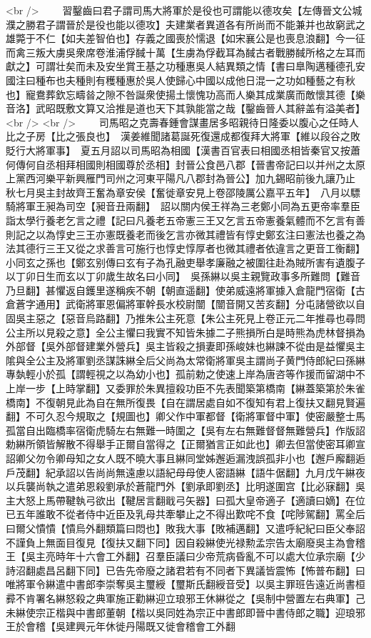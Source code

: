 <br />
　　習鑿齒曰君子謂司馬大將軍於是役也可謂能以德攻矣【左傳晉文公城濮之勝君子謂晉於是役也能以德攻】夫建業者異道各有所尚而不能兼并也故窮武之雄斃于不仁【如夫差智伯也】存義之國喪於懦退【如宋襄公是也喪息浪翻】今一征而禽三叛大虜吳衆席卷淮浦俘馘十萬【生虜為俘截耳為馘古者戰勝馘所格之左耳而獻之】可謂壮矣而未及安坐賞王基之功種惠吳人結異類之情【書曰臯陶邁種德孔安國注曰種布也夫種則有穫種惠於吳人使歸心中國以成他日混一之功如種藝之有秋也】寵鴦葬欽忘疇㫺之隙不咎誕衆使揚土懷愧功高而人樂其成業廣而敵懷其德【樂音洛】武昭既敷文算又洽推是道也天下其孰能當之哉【鑿齒晉人其辭盖有溢美者】<br />
<br />
　　司馬昭之克壽春鍾會謀畫居多昭親待日隆委以腹心之任時人比之子房【比之張良也】　漢姜維聞諸葛誕死復還成都復拜大將軍【維以段谷之敗貶行大將軍事】　夏五月詔以司馬昭為相國【漢書百官表曰相國丞相皆秦官又按蕭何傳何自丞相拜相國則相國尊於丞相】封晉公食邑八郡【晉書帝記曰以并州之太原上黨西河樂平新興雁門司州之河東平陽凡八郡封為晉公】加九錫昭前後九讓乃止　秋七月吳主封故齊王奮為章安侯【奮徙章安見上卷邵陵厲公嘉平五年】　八月以驃騎將軍王昶為司空【昶音丑兩翻】　詔以關内侯王祥為三老鄭小同為五更帝率羣臣詣太學行養老乞言之禮【記曰凡養老五帝憲三王又乞言五帝憲養氣體而不乞言有善則記之以為惇史三王亦憲既養老而後乞言亦微其禮皆有惇史鄭玄注曰憲法也養之為法其德行三王又從之求善言可施行也惇史惇厚者也微其禮者依違言之更音工衡翻】小同玄之孫也【鄭玄别傳曰玄有子為孔融吏舉孝廉融之被圍往赴為賊所害有遺腹子以丁卯日生而玄以丁卯歲生故名曰小同】　吳孫綝以吳主親覽政事多所難問【難音乃旦翻】甚懼返自鑊里遂稱疾不朝【朝直遥翻】使弟威遠將軍據入倉龍門宿衛【古倉蒼字通用】武衛將軍恩偏將軍幹長水校尉闓【闓音開又苦亥翻】分屯諸營欲以自固吳主惡之【惡音烏路翻】乃推朱公主死意【朱公主死見上卷正元二年推尋也尋問公主所以見殺之意】全公主懼曰我實不知皆朱據二子熊損所白是時熊為虎林督損為外部督【吳外部督建業外營兵】吳主皆殺之損妻即孫峻妹也綝諫不從由是益懼吳主隂與全公主及將軍劉丞謀誅綝全后父尚為太常衛將軍吳主謂尚子黄門侍郎紀曰孫綝專埶輕小於孤【謂輕視之以為幼小也】孤前勅之使速上岸為唐咨等作援而留湖中不上岸一步【上時掌翻】又委罪於朱異擅殺功臣不先表聞築第橋南【綝蓋築第於朱雀橋南】不復朝見此為自在無所復畏【自在謂居處自如不復知有君上復扶又翻見賢遍翻】不可久忍今規取之【規圖也】卿父作中軍都督【衛將軍督中軍】使密嚴整士馬孤當自出臨橋率宿衛虎騎左右無難一時圍之【吳有左右無難督督無難營兵】作版詔勅綝所領皆解散不得舉手正爾自當得之【正爾猶言正如此也】卿去但當使密耳卿宣詔卿父勿令卿母知之女人既不曉大事且綝同堂姊邂逅漏洩誤孤非小也【邂戶廨翻逅戶茂翻】紀承詔以告尚尚無遠慮以語紀母母使人密語綝【語牛倨翻】九月戊午綝夜以兵襲尚執之遣弟恩殺劉承於蒼龍門外【劉承即劉丞】比明遂圍宫【比必寐翻】吳主大怒上馬帶鞬執弓欲出【鞬居言翻戢弓矢器】曰孤大皇帝適子【適讀曰嫡】在位已五年誰敢不從者侍中近臣及乳母共牽攀止之不得出歎咤不食【咤陟駕翻】罵全后曰爾父憒憒【憒烏外翻類篇曰悶也】敗我大事【敗補邁翻】又遣呼紀紀曰臣父奉詔不謹負上無面目復見【復扶又翻下同】因自殺綝使光禄勲孟宗告太廟廢吳主為會稽王【吳主亮時年十六會工外翻】召羣臣議曰少帝荒病昏亂不可以處大位承宗廟【少詩沼翻處昌呂翻下同】已告先帝廢之諸君若有不同者下異議皆震怖【怖普布翻】曰唯將軍令綝遣中書郎李崇奪吳主璽綬【璽斯氏翻綬音受】以吳主罪班告遠近尚書桓彛不肯署名綝怒殺之典軍施正勸綝迎立琅邪王休綝從之【吳制中營置左右典軍】己未綝使宗正楷與中書郎董朝【楷以吳同姓為宗正中書郎即晉中書侍郎之職】迎琅邪王於會稽【吳建興元年休徙丹陽既又徙會稽會工外翻